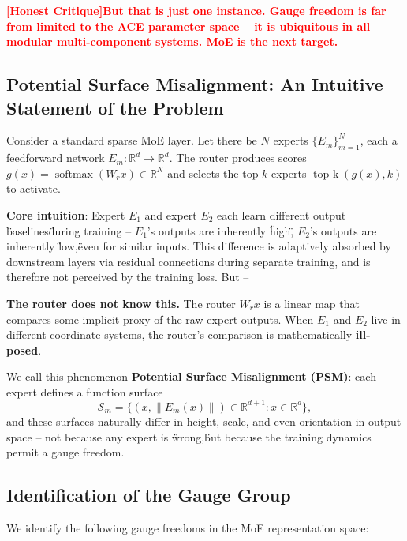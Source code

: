 \documentclass[12pt,a4paper]{article}
\theoremstyle{remark}
\newcommand{\R}{\mathbb{R}}
\DeclareMathOperator{\softmax}{softmax}
\DeclareMathOperator{\topk}{top\text{-}k}
\newcommand{\honestcrit}[1]{%
    \textcolor{red}{\textbf{[Honest Critique]#1}}%
}
\begin{document}
\honestcrit{But that is just one instance. Gauge freedom is far from limited to the ACE parameter space -- it is ubiquitous in all modular multi-component systems. MoE is the next target.}

\subsection{Potential Surface Misalignment: An Intuitive Statement of the Problem}

Consider a standard sparse MoE layer. Let there be $N$ experts $\{E_m\}_{m=1}^{N}$, each a feedforward network $E_m: \R^d \to \R^d$. The router produces scores $g(x) = \softmax(W_r x) \in \R^N$ and selects the top-$k$ experts $\topk(g(x), k)$ to activate.

\textbf{Core intuition}: Expert $E_1$ and expert $E_2$ each learn different output \"baselines\" during training -- $E_1$'s outputs are inherently \"high,\" $E_2$'s outputs are inherently \"low,\" even for similar inputs. This difference is adaptively absorbed by downstream layers via residual connections during separate training, and is therefore not perceived by the training loss. But --

\textbf{The router does not know this.} The router $W_r x$ is a linear map that compares some implicit proxy of the raw expert outputs. When $E_1$ and $E_2$ live in different coordinate systems, the router's comparison is mathematically \textbf{ill-posed}.

We call this phenomenon \textbf{Potential Surface Misalignment (PSM)}: each expert defines a function surface
\begin{equation}
    \mathcal{S}_m = \{(x, \|E_m(x)\|) \in \R^{d+1} : x \in \R^d\},
\end{equation}
and these surfaces naturally differ in height, scale, and even orientation in output space -- not because any expert is \"wrong,\" but because the training dynamics permit a gauge freedom.

\subsection{Identification of the Gauge Group}

We identify the following gauge freedoms in the MoE representation space:
\end{document}
